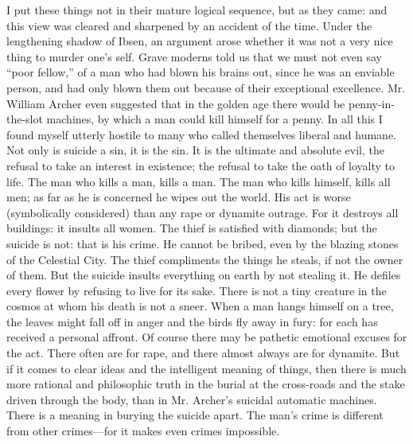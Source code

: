I put these things not in their mature logical sequence, but as they came: and this view was cleared and sharpened by an accident of the time. Under the lengthening shadow of Ibsen, an argument arose whether it was not a very nice thing to murder one’s self. Grave moderns told us that we must not even say “poor fellow,” of a man who had blown his brains out, since he was an enviable person, and had only blown them out because of their exceptional excellence. Mr. William Archer even suggested that in the golden age there would be penny-in-the-slot machines, by which a man could kill himself for a penny. In all this I found myself utterly hostile to many who called themselves liberal and humane. Not only is suicide a sin, it is the sin. It is the ultimate and absolute evil, the refusal to take an interest in existence; the refusal to take the oath of loyalty to life. The man who kills a man, kills a man. The man who kills himself, kills all men; as far as he is concerned he wipes out the world. His act is worse (symbolically considered) than any rape or dynamite outrage. For it destroys all buildings: it insults all women. The thief is satisfied with diamonds; but the suicide is not: that is his crime. He cannot be bribed, even by the blazing stones of the Celestial City. The thief compliments the things he steals, if not the owner of them. But the suicide insults everything on earth by not stealing it. He defiles every flower by refusing to live for its sake. There is not a tiny creature in the cosmos at whom his death is not a sneer. When a man hangs himself on a tree, the leaves might fall off in anger and the birds fly away in fury: for each has received a personal affront. Of course there may be pathetic emotional excuses for the act. There often are for rape, and there almost always are for dynamite. But if it comes to clear ideas and the intelligent meaning of things, then there is much more rational and philosophic truth in the burial at the cross-roads and the stake driven through the body, than in Mr. Archer’s suicidal automatic machines. There is a meaning in burying the suicide apart. The man’s crime is different from other crimes—for it makes even crimes impossible.

